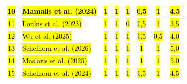 \documentclass[brazilian]{sbc2025}
\newif\ifhl \hltrue
\newcommand{\rev}[1]{\ifhl\sethlcolor{yellow}\hl{#1}\else#1\fi}
\begin{document}
\begin{table}[p]
\begin{tabular}{|c|p{7.2cm}|c|c|c|c|c|c|}
\rev{10} & \rev{Mamalis et al. (2024)}               & \rev{1} & \rev{1} & \rev{1} & \rev{0,5} & \rev{1} & \rev{4,5} \\ \hline
\rev{11} & \rev{Loukis et al. (2023)}                & \rev{1} & \rev{1} & \rev{0} & \rev{0,5} & \rev{1} & \rev{3,5} \\ \hline
\rev{12} & \rev{Wu et al. (2025)}                    & \rev{1} & \rev{1} & \rev{1} & \rev{0,5} & \rev{0,5} & \rev{4,0} \\ \hline
\rev{13} & \rev{Schelhorn et al. (2026)}             & \rev{1} & \rev{1} & \rev{1} & \rev{1} & \rev{1} & \rev{5,0} \\ \hline
\rev{14} & \rev{Maslaris et al. (2025)}              & \rev{1} & \rev{1} & \rev{1} & \rev{1} & \rev{1} & \rev{5,0} \\ \hline
\rev{15} & \rev{Schelhorn et al. (2024)}             & \rev{1} & \rev{1} & \rev{1} & \rev{0,5} & \rev{1} & \rev{4,5} \\ \hline
\end{tabular}
\end{table}
\end{document}
